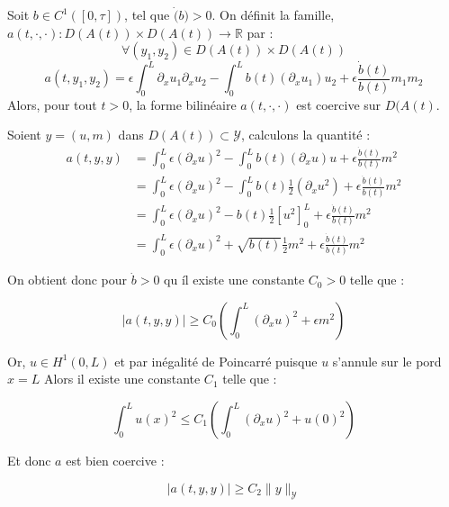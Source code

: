 \documentclass[a4paper]{article}
\newcommand{\dep}{b}
\begin{document}
\begin{lemme}
	Soit $b \in C^1([0,\tau])$, tel que $\dot(b)>0$.
 	On définit la famille,
	$a(t,\cdot, \cdot): D(A(t)) \times D(A(t)) \to \mathbb{R}$ par :
 	\[
 	\forall (y_1,y_2) \in D(A(t)) \times D(A(t))
	\]
	\begin{equation}
		\label{def:a3}
		 a(t,y_1,y_2) =   \epsilon \int_0^L \partial_xu_1 \partial_xu_2
		                 - \int_0^L \dep (t) (\partial_xu_1)u_2
                        +\epsilon \displaystyle \frac{\dot{\dep}(t)}{\dep(t)}m_1m_2
	\end{equation}
	Alors, pour tout $t>0$, la forme bilinéaire $a(t, \cdot, \cdot)$ est coercive sur $D(A(t)$.
\end{lemme}

\begin{preuve}
	Soient $y=(u,m)$ dans $D(A(t)) \subset {\mathscr{Y}}$, calculons la quantité :
	\[
	\begin{split}
		 a(t,y,y) &=  \int_0^L \epsilon (\partial_x u)^2
		                 - \int_0^L \dep (t) (\partial_x u)u
						 + \epsilon \displaystyle \frac{\dot{\dep}(t)}{\dep(t)}m^2\\
				  &= \int_0^L \epsilon (\partial_xu)^2
				     - \int_0^L \dep (t) \displaystyle \frac{1}{2} (\partial_xu^2)
					 + \epsilon \displaystyle \frac{\dot{\dep}(t)}{\dep(t)}m^2 \\
				 & = \int_0^L \epsilon (\partial_xu)^2
				 -  \dep (t)\displaystyle \frac{1}{2} [u^2]_0^L
				  + \epsilon \displaystyle \frac{\dot{\dep}(t)}{\dep(t)}m^2 \\
 				 & = \int_0^L \epsilon (\partial_xu)^2
 				   + \sqrt{\dep (t)} \displaystyle \frac{1}{2} m^2
 				    + \epsilon \displaystyle \frac{\dot{\dep}(t)}{\dep(t)}m^2		  
    \end{split}
	\]
		
	On obtient donc pour $\dot{\dep}>0$ qu íl existe une constante $C_0>0$ telle que :

	
	\[  |a(t,y,y)| \geq C_0 (\int_0^L  (\partial_xu)^2
 				   + \epsilon  m^2) \]
				   
	Or, $u \in H^1(0,L)$ et par inégalité de Poincarré puisque $u$ s'annule sur le pord $x=L$
	Alors il existe une constante $C_1$ telle que :
	
	\[ \int_0^L u(x)^2 \leq C_1 (\int_0^L  (\partial_xu)^2 + u(0)^2) \] 
	
	Et donc $a$ est bien coercive :
	
	\[  |a(t,y,y)| \geq C_2 \|y\|_{\mathscr{Y}} \]
	
\end{preuve}
 
\end{document}
